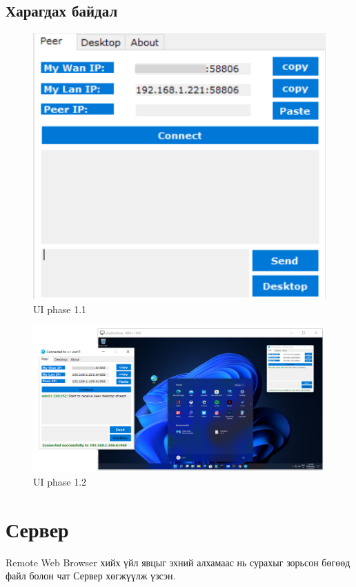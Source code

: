 \subsection{Харагдах байдал}
\begin{figure}
	\centering
	\includegraphics[width=15cm]{images/ui1.png}
	\caption{UI phase 1.1}
	\label{fig:form}
\end{figure}
\pagebreak
\begin{figure}
	\centering
	\includegraphics[width=15
	cm]{images/ui2.png}
	\caption{UI phase 1.2}
	\label{fig:form}
\end{figure}
\pagebreak
\section{Сервер}
Remote Web Browser хийх үйл явцыг эхний алхамаас нь сурахыг зорьсон бөгөөд файл болон чат Сервер хөгжүүлж үзсэн. 

